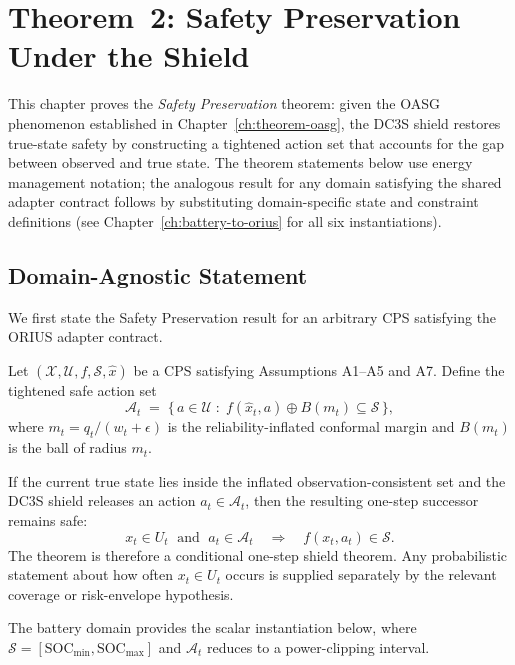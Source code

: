 
\chapter{Theorem~2: Safety Preservation Under the Shield}
\label{ch:theorem-safety}

This chapter proves the \emph{Safety Preservation} theorem: given the
OASG phenomenon established in Chapter~\ref{ch:theorem-oasg}, the DC3S
shield restores true-state safety by constructing a tightened action set
that accounts for the gap between observed and true state.  The theorem
statements below use energy management notation; the analogous result for
any domain satisfying the shared adapter contract follows by substituting
domain-specific state and constraint definitions
(see Chapter~\ref{ch:battery-to-orius} for all six instantiations).

\section{Domain-Agnostic Statement}

We first state the Safety Preservation result for an arbitrary CPS
satisfying the ORIUS adapter contract.

\begin{theorem}
\label{thm:safety-general}
Let $(\mathcal{X}, \mathcal{U}, f, \mathcal{S}, \hat{x})$ be a CPS
satisfying Assumptions A1--A5 and A7.  Define the tightened safe
action set
\[
  \mathcal{A}_t \;=\; \bigl\{\,a \in \mathcal{U} \;:\;
    f(\hat{x}_t, a) \oplus B(m_t) \subseteq \mathcal{S}\,\bigr\},
\]
where $m_t = q_t / (w_t + \epsilon)$ is the reliability-inflated
conformal margin and $B(m_t)$ is the ball of radius $m_t$.

If the current true state lies inside the inflated observation-consistent
set and the DC3S shield releases an action $a_t \in \mathcal{A}_t$, then the
resulting one-step successor remains safe:
\[
  x_t \in U_t \;\text{ and }\; a_t \in \mathcal{A}_t
  \quad\Longrightarrow\quad
  f(x_t, a_t) \in \mathcal{S}.
\]
The theorem is therefore a conditional one-step shield theorem.  Any
probabilistic statement about how often $x_t \in U_t$ occurs is supplied
separately by the relevant coverage or risk-envelope hypothesis.
\end{theorem}

The battery domain provides the scalar instantiation below, where
$\mathcal{S} = [\text{SOC}_{\min}, \text{SOC}_{\max}]$ and
$\mathcal{A}_t$ reduces to a power-clipping interval.

